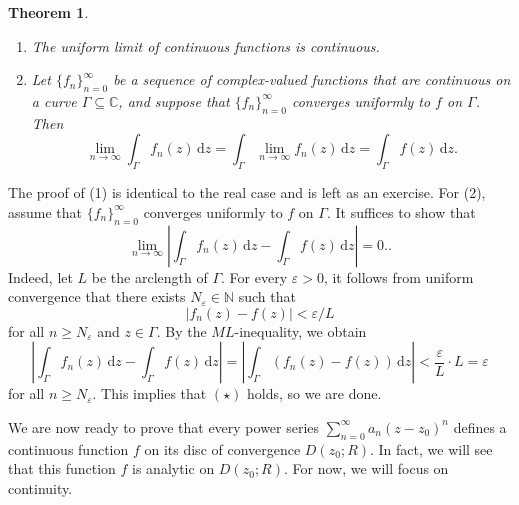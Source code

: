\documentclass[10pt]{article}
\makeatletter
\newcommand{\eps}{\varepsilon}
\newcommand{\C}{\mathbb{C}}
\newcommand{\N}{\mathbb{N}}
\newcommand{\dd}{\,\mathrm{d}}
\theoremstyle{newstyle}
\newtheorem{thm}{Theorem}[section]
\newenvironment{pf}[1][\proofname]{\par
  \pushQED{\qed}%
  \normalfont \topsep0\p@\relax
  \trivlist
  \item[\hskip\labelsep\scshape
  #1\@addpunct{.}]\ignorespaces
}{%
  \popQED\endtrivlist\@endpefalse
}
\makeatother
\begin{document}
\begin{thm}~
\begin{enumerate}[(1)]
    \item The uniform limit of continuous functions is continuous. 
    \item Let $\{f_n\}_{n=0}^\infty$ be a sequence of complex-valued functions that are 
    continuous on a curve $\Gamma \subseteq \C$, and suppose that $\{f_n\}_{n=0}^\infty$ 
    converges uniformly to $f$ on $\Gamma$. Then 
    \[ \lim_{n\to\infty} \int_\Gamma f_n(z)\dd z = \int_\Gamma \lim_{n\to\infty} f_n(z)\dd z = 
    \int_\Gamma f(z)\dd z. \]
\end{enumerate}
\end{thm}
\begin{pf}
The proof of (1) is identical to the real case and is left as an exercise. 
For (2), assume that $\{f_n\}_{n=0}^\infty$ converges uniformly to $f$ on $\Gamma$. 
It suffices to show that 
\[ \lim_{n\to\infty} \left| \int_\Gamma f_n(z)\dd z - \int_\Gamma f(z)\dd z \right| = 0. \tag{$\star$}. \]
Indeed, let $L$ be the arclength of $\Gamma$. For every $\eps > 0$, it follows from 
uniform convergence that there exists $N_\eps \in \N$ such that 
\[ |f_n(z) - f(z)| < \eps/L \]
for all $n \geq N_\eps$ and $z \in \Gamma$. By the $ML$-inequality, we obtain 
\[ \left|\int_\Gamma f_n(z)\dd z - \int_\Gamma f(z)\dd z \right| = 
\left| \int_\Gamma (f_n(z) - f(z))\dd z \right| < \frac{\eps}L \cdot L = \eps \]
for all $n \geq N_\eps$. This implies that $(\star)$ holds, so we are done. 
\end{pf}

We are now ready to prove that every power series $\sum_{n=0}^\infty a_n(z-z_0)^n$ defines a 
continuous function $f$ on its disc of convergence $D(z_0; R)$. In fact, we will see 
that this function $f$ is analytic on $D(z_0; R)$. For now, we will focus on continuity. 
\end{document}
